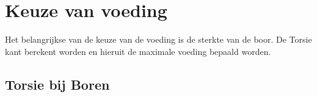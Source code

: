 \documentclass[a4paper,12pt,twoside]{report}
\begin{document}
\section{Keuze van voeding}

Het belangrijkse van de keuze van de voeding is de sterkte van de boor.
De Torsie kant berekent worden en hieruit de maximale voeding bepaald worden.

\subsection{Torsie bij Boren}
\end{document}
